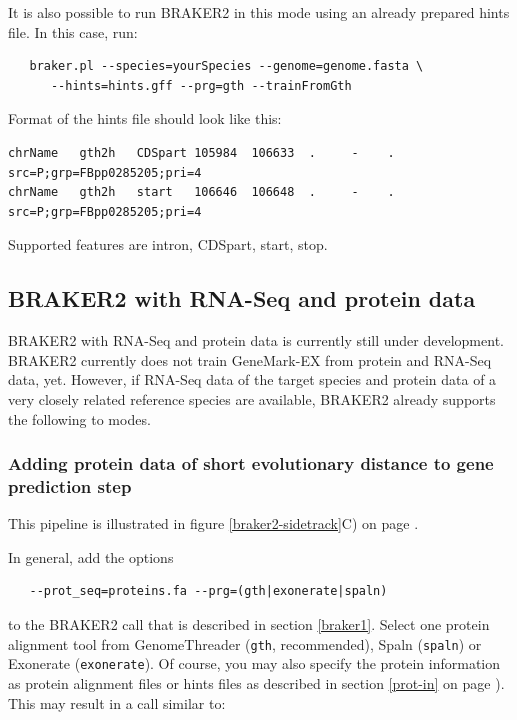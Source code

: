 \documentclass[a4paper,10pt]{report}
\begin{document}
It is also possible to run BRAKER2 in this mode using an already prepared hints file. In this case, run:

\begin{verbatim}
   braker.pl --species=yourSpecies --genome=genome.fasta \
      --hints=hints.gff --prg=gth --trainFromGth
\end{verbatim}

Format of the hints file should look like this:

\begin{verbatim}
chrName   gth2h   CDSpart 105984  106633  .     -    .    src=P;grp=FBpp0285205;pri=4
chrName   gth2h   start   106646  106648  .     -    .    src=P;grp=FBpp0285205;pri=4
\end{verbatim}

Supported features are intron, CDSpart, start, stop.

\subsection{BRAKER2 with RNA-Seq and protein data}

BRAKER2 with RNA-Seq and protein data is currently still under development. BRAKER2 currently does not train GeneMark-EX from protein and RNA-Seq data, yet. However, if RNA-Seq data of the target species and protein data of a very closely related reference species are available, BRAKER2 already supports the following to modes.

\subsubsection{Adding protein data of short evolutionary distance to gene prediction step}

This pipeline is illustrated in figure \ref{braker2-sidetrack}C) on page \pageref{braker2-sidetrack}.

In general, add the options

\begin{verbatim}
   --prot_seq=proteins.fa --prg=(gth|exonerate|spaln)
\end{verbatim}

to the BRAKER2 call that is described in section \ref{braker1}. Select one protein alignment tool from GenomeThreader (\texttt{gth}, recommended), Spaln (\texttt{spaln}) or Exonerate (\texttt{exonerate}). Of course, you may also specify the protein information as protein alignment files or hints files as described in section \ref{prot-in} on page \pageref{prot-in}). This may result in a call similar to:
\end{document}
